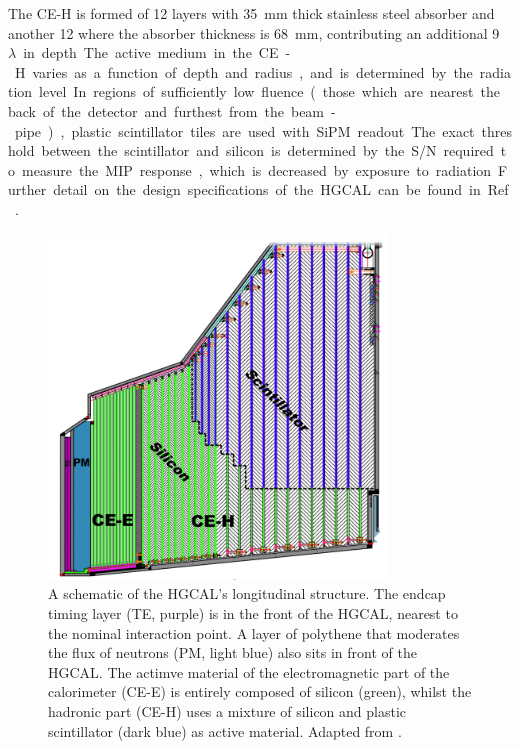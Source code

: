 The CE-H is formed of 12 layers with \SI{35}{mm} thick stainless steel absorber and another 12 where the absorber thickness is \SI{68}{mm}, contributing an additional \SI{9}{$\lambda$} in depth.
The active medium in the CE-H varies as a function of depth and radius, and is determined by the radiation level.
In regions of sufficiently low fluence (those which are nearest the back of the detector and furthest from the beam-pipe), plastic scintillator tiles are used with SiPM readout.
The exact threshold between the scintillator and silicon is determined by the S/N required to measure the MIP response, which is decreased by exposure to radiation.
Further detail on the design specifications of the HGCAL can be found in Ref.~\cite{HGCAL}.

\begin{figure}[h!]
  \centering
  \includegraphics[width=0.8\textwidth]{Figures/HGCAL/TheHGCAL.png}
  \caption[Schematic of the HGCAL.]
  {
    A schematic of the HGCAL's longitudinal structure. 
    The endcap timing layer (TE, purple) is in the front of the HGCAL, 
    nearest to the nominal interaction point.
    A layer of polythene that moderates the flux of neutrons (PM, light blue) 
    also sits in front of the HGCAL.
    The actimve material of the electromagnetic part of the calorimeter (CE-E) 
    is entirely composed of silicon (green),
    whilst the hadronic part (CE-H) uses a mixture of silicon and plastic scintillator (dark blue)
    as active material.
    Adapted from \cite{HGCAL}.
  }
  \label{fig:hgcal_TheHGCAL}
\end{figure}

